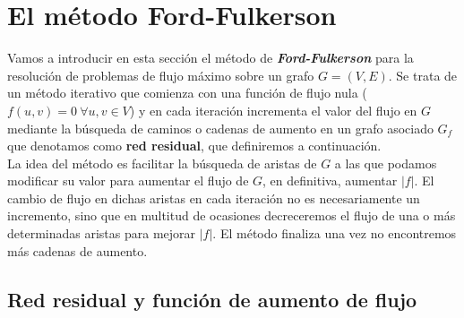 \section{El método Ford-Fulkerson}
Vamos a introducir en esta sección el método de \textit{\textbf{Ford-Fulkerson}} para la resolución de problemas de flujo máximo sobre un grafo $G=(V,E)$. Se trata de un método iterativo que comienza con una función de flujo nula ($f(u,v)= 0\ \forall u,v\in V$) y en cada iteración incrementa el valor del flujo en $G$ mediante la búsqueda de caminos o cadenas de aumento en un grafo asociado $G_f$ que denotamos como \textbf{red residual}, que definiremos a continuación.\\

La idea del método es facilitar la búsqueda de aristas de $G$ a las que podamos modificar su valor para aumentar el flujo de $G$, en definitiva, aumentar $|f|$. El cambio de flujo en dichas aristas en cada iteración no es necesariamente un incremento, sino que en multitud de ocasiones decreceremos el flujo de una o más determinadas aristas para mejorar $|f|$. El método finaliza una vez no encontremos más cadenas de aumento.\\

\subsection{Red residual y función de aumento de flujo}

